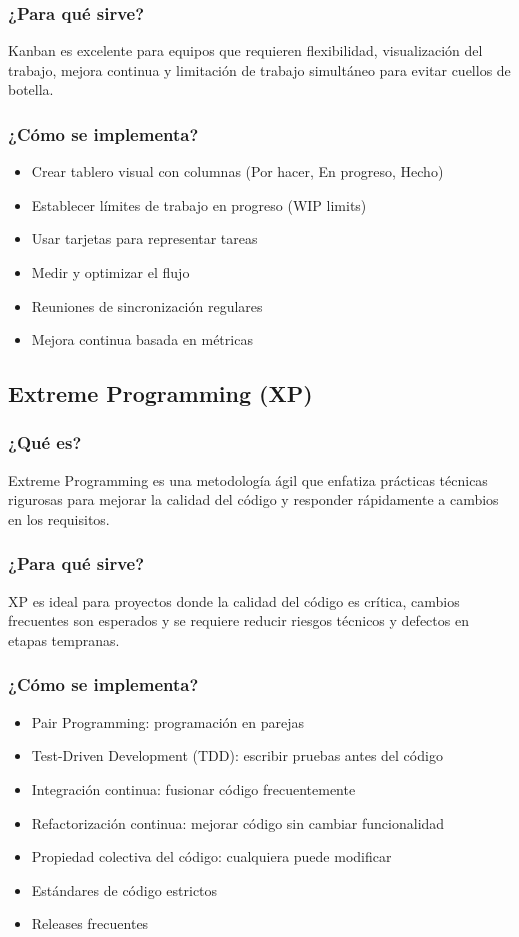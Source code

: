\documentclass[12pt, a4paper]{article}
\begin{document}
\subsubsection{¿Para qué sirve?}
Kanban es excelente para equipos que requieren flexibilidad, visualización del trabajo, mejora continua y limitación de trabajo simultáneo para evitar cuellos de botella.

\subsubsection{¿Cómo se implementa?}
\begin{itemize}
    \item Crear tablero visual con columnas (Por hacer, En progreso, Hecho)
    \item Establecer límites de trabajo en progreso (WIP limits)
    \item Usar tarjetas para representar tareas
    \item Medir y optimizar el flujo
    \item Reuniones de sincronización regulares
    \item Mejora continua basada en métricas
\end{itemize}

\subsection{Extreme Programming (XP)}

\subsubsection{¿Qué es?}
Extreme Programming es una metodología ágil que enfatiza prácticas técnicas rigurosas para mejorar la calidad del código y responder rápidamente a cambios en los requisitos.

\subsubsection{¿Para qué sirve?}
XP es ideal para proyectos donde la calidad del código es crítica, cambios frecuentes son esperados y se requiere reducir riesgos técnicos y defectos en etapas tempranas.

\subsubsection{¿Cómo se implementa?}
\begin{itemize}
    \item Pair Programming: programación en parejas
    \item Test-Driven Development (TDD): escribir pruebas antes del código
    \item Integración continua: fusionar código frecuentemente
    \item Refactorización continua: mejorar código sin cambiar funcionalidad
    \item Propiedad colectiva del código: cualquiera puede modificar
    \item Estándares de código estrictos
    \item Releases frecuentes
\end{itemize}
\end{document}
